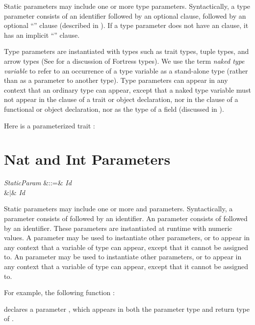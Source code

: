 Static parameters may include one or more type parameters.
Syntactically, a type parameter consists of an identifier followed by an
optional  clause, followed by an optional
``'' clause (described in
).
If a type parameter does not have an  clause, it has an
implicit ``'' clause.


Type parameters are instantiated with types such as trait types, tuple types,
and arrow types (See  for a discussion of Fortress
types).  We use the term \emph{naked type variable} to refer to an
occurrence of a type variable as a stand-alone type (rather than as
a parameter to another type).  Type parameters can appear in any context
that an ordinary type can appear, except that a naked type variable must not
appear in the  clause of a trait or object declaration,
nor in the  clause of a functional or object declaration,
nor as the type of a  field (discussed in ).


Here is a parameterized trait :



\section{Nat and Int Parameters}

\begin{Grammar}
\emph{StaticParam} &::=&  \emph{Id} \\
&$|$&  \emph{Id} \\
\end{Grammar}

Static parameters may include one or more
 and  parameters.
Syntactically, a  parameter consists of
 followed by an identifier.
An  parameter consists of
 followed by an identifier.
These parameters are instantiated at runtime with numeric values.
A  parameter may be used to instantiate other
 parameters, or to appear in any context that a
variable of type  can appear,
except that it cannot be assigned to.
An  parameter may be used to instantiate other
 parameters, or to appear in any context that a
variable of type  can appear,
except that it cannot be assigned to.



For example, the following function :

declares a  parameter , which appears in both the parameter
type and return type of .



